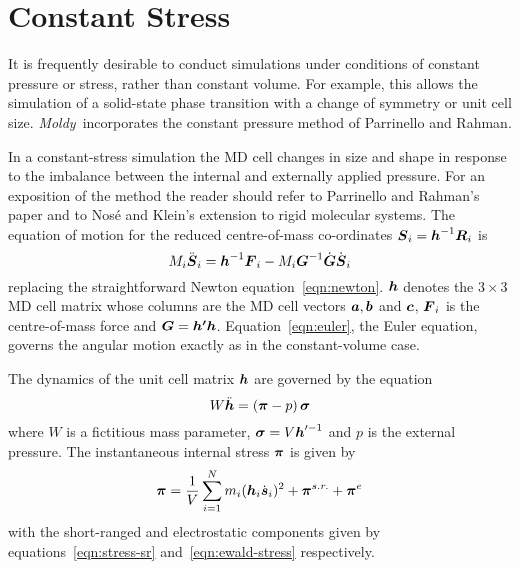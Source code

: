\documentclass[twoside]{report}
\newcommand{\moldy}{{\em Moldy}}
\newcommand{\bm}[1]{\mbox{\boldmath \protect\(#1\protect\)}}
\begin{document}
\section{Constant Stress}%
\label{sec:const-stress}
It is frequently desirable to conduct simulations under conditions of
constant pressure or stress, rather than constant volume.  For
example, this allows the simulation of a solid-state phase transition
with a change of symmetry or unit cell size.  \moldy\ incorporates the
constant pressure method of Parrinello and Rahman\cite{parrinello:81}.

In a constant-stress simulation the MD cell changes in size and shape
in response to the imbalance between the internal and externally
applied pressure.  For an exposition of the method the reader should
refer to Parrinello and Rahman's paper\cite{parrinello:81} and to
Nos\'{e} and Klein's extension to rigid molecular
systems\cite{nose:83}.  The equation of motion for the reduced
centre-of-mass co-ordinates $\bm{S}_i =
\bm{h}^{-1}\bm{R}_i$ is
\begin{equation}
\label{eqn:par}
M_i\ddot{\bm{S}}_i = \bm{h}^{-1} \bm{F}_i - M_i \bm{G}^{-1}\dot{\bm{G}}\dot{\bm{S}}_i
\end{equation}
replacing the straightforward Newton equation~\ref{eqn:newton}.
$\bm{h}$ denotes the $3 \times 3$ MD cell matrix whose columns are
the MD cell vectors $\bm{a}, \bm{b}$ and $\bm{c}$, $\bm{F}_i$ is the
centre-of-mass force and $\bm{G} =\bm{h^\prime h}$.
Equation~\ref{eqn:euler}, the Euler equation, governs the angular
motion exactly as in the constant-volume case.

The dynamics of the unit cell matrix $\bm{h}$ are governed by the
equation
\begin{equation}
\label{eqn:rahman}
W\ddot{\bm{h}} = \left ( \bm{\pi} - p \right ) \bm{\sigma}
\end{equation}
where $W$ is a fictitious mass parameter, $\bm{\sigma} = V
\bm{h}^{\prime-1}$ and $p$ is the external pressure.  The
instantaneous internal stress $\bm{\pi}$ is given by 
\begin{equation}
\bm{\pi} = \frac{1}{V}\sum_{i=1}^N m_i (\bm{h}_i\dot{\bm{s}}_i)^2 + \bm{\pi}^{s.r.} + \bm{\pi}^e
\end{equation}
with the short-ranged and electrostatic components given by
equations~\ref{eqn:stress-sr} and~\ref{eqn:ewald-stress} respectively.
\end{document}
